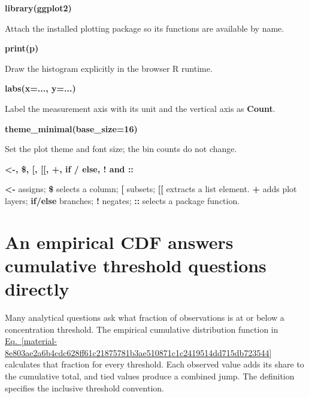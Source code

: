 \documentclass[11pt,a4paper]{article}
\begin{document}
\par\noindent\textbf{library(ggplot2)}

Attach the installed plotting package so its functions are available by name.

\par\noindent\textbf{print(p)}

Draw the histogram explicitly in the browser R runtime.

\par\noindent\textbf{labs(x=..., y=...)}

Label the measurement axis with its unit and the vertical axis as \textbf{Count}.

\par\noindent\textbf{theme\_minimal(base\_size=16)}

Set the plot theme and font size; the bin counts do not change.

\par\noindent\textbf{<-, \$, [, [[, +, if / else, ! and ::}

\textbf{<-} assigns; \textbf{\$} selects a column; \textbf{[} subsets; \textbf{[[} extracts a list element. \textbf{+} adds plot layers; \textbf{if/else} branches; \textbf{!} negates; \textbf{::} selects a package function.

\medskip

\clearpage
\section{An empirical CDF answers cumulative threshold questions directly}
Many analytical questions ask what fraction of observations is at or below a concentration threshold. The empirical cumulative distribution function in \hyperref[material-8e803ae2a6b4cdc628ff61c21875781b3ae510871c1c2419514dd715db723544]{Eq.~\ref*{material-8e803ae2a6b4cdc628ff61c21875781b3ae510871c1c2419514dd715db723544}} calculates that fraction for every threshold. Each observed value adds its share to the cumulative total, and tied values produce a combined jump. The definition specifies the inclusive threshold convention.
\end{document}
